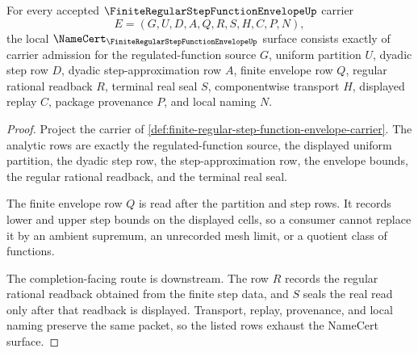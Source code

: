 \begin{theorem}
\label{thm:finite-regular-step-function-envelope-obligations}
For every accepted $\FiniteRegularStepFunctionEnvelopeUp$ carrier
$$
E=(G,U,D,A,Q,R,S,H,C,P,N),
$$
the local $\NameCert_{\FiniteRegularStepFunctionEnvelopeUp}$ surface consists exactly of carrier admission for the regulated-function source $G$, uniform partition $U$, dyadic step row $D$, dyadic step-approximation row $A$, finite envelope row $Q$, regular rational readback $R$, terminal real seal $S$, componentwise transport $H$, displayed replay $C$, package provenance $P$, and local naming $N$.
\end{theorem}
\begin{proof}
Project the carrier of \autoref{def:finite-regular-step-function-envelope-carrier}. The analytic rows are exactly the regulated-function source, the displayed uniform partition, the dyadic step row, the step-approximation row, the envelope bounds, the regular rational readback, and the terminal real seal.

The finite envelope row $Q$ is read after the partition and step rows. It records lower and upper step bounds on the displayed cells, so a consumer cannot replace it by an ambient supremum, an unrecorded mesh limit, or a quotient class of functions.

The completion-facing route is downstream. The row $R$ records the regular rational readback obtained from the finite step data, and $S$ seals the real read only after that readback is displayed. Transport, replay, provenance, and local naming preserve the same packet, so the listed rows exhaust the NameCert surface.
\end{proof}



